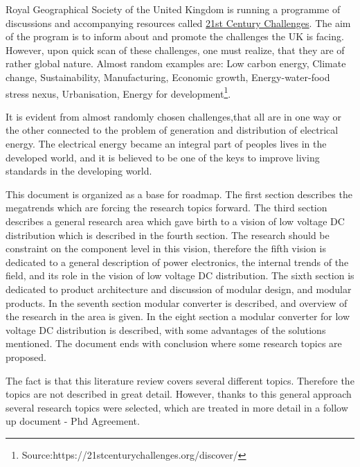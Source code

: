 \documentclass[]{scrartcl}
\begin{document}

Royal Geographical Society of the United Kingdom is running a programme of discussions and accompanying resources called \href{<https://21stcenturychallenges.org/discover/>}{21st Century Challenges}. The aim of the program is to inform about and promote the challenges the UK is facing. However, upon quick scan of these challenges, one must realize, that they are of rather global nature. Almost random examples are: Low carbon energy, Climate change, Sustainability, Manufacturing, Economic growth, Energy-water-food stress nexus, Urbanisation, Energy for development\footnote{Source:https://21stcenturychallenges.org/discover/}.

It is evident from almost randomly chosen challenges,that all are in one way or the other connected to the problem of generation and distribution of electrical energy.  The electrical energy became an integral part of peoples lives in the developed world, and it is believed to be one of the keys to improve living standards in the developing world. 

This document is organized as a base for roadmap. The first section describes the megatrends which are forcing the research topics forward. The third section describes a general research area which gave birth to a vision of low voltage DC distribution which is described in the fourth section. The research should be constraint on the component level in this vision, therefore the fifth vision is dedicated to a general description of power electronics, the internal trends of the field, and its role in the vision of low voltage DC distribution. The sixth section is dedicated  to product architecture and discussion of modular design, and modular products. In the seventh section modular converter is described, and overview of the research in the area is given. In the eight section a modular converter for low voltage DC distribution is described, with some advantages  of the solutions mentioned. The document ends with conclusion where some research topics are proposed.

The fact is that this literature review covers several different topics. Therefore the topics are not described in great detail. However, thanks to this general approach several research topics were selected, which are treated in more detail in a follow up document - Phd Agreement.
\end{document}
